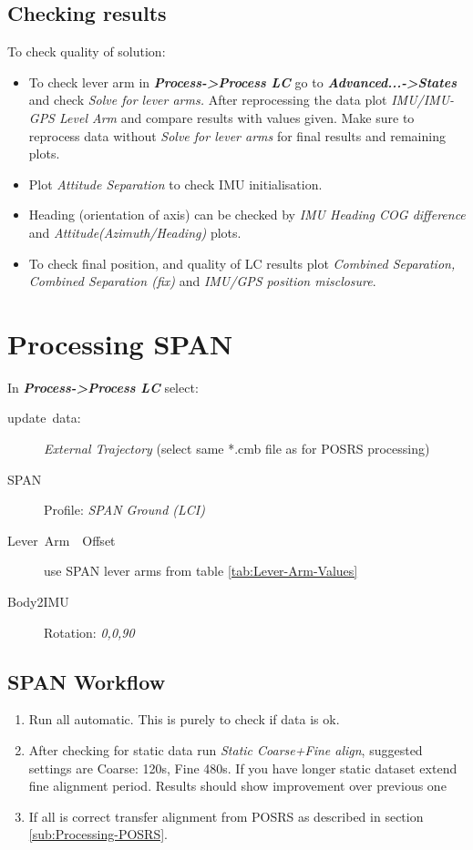 \documentclass[11pt,fleqn]{book} %
\begin{document}
\subsection{Checking results}

To check quality of solution:

\begin{itemize}
	\item To check lever arm in \textbf{\emph{Process->Process LC}} go to \textbf{\emph{Advanced...->States }}and check\emph{ Solve for lever arms. }After reprocessing the data plot\emph{ IMU/IMU-GPS Level Arm} and compare results with values given. Make sure to reprocess data without \emph{Solve for lever arms }for final results and remaining plots.
	\item Plot \emph{Attitude Separation} to check IMU initialisation.
	\item Heading (orientation of axis) can be checked by \emph{IMU Heading COG difference} and \emph{Attitude(Azimuth/Heading)} plots.
	\item To check final position, and quality of LC results plot \emph{Combined Separation, Combined Separation (fix)} and\emph{ IMU/GPS position misclosure}. 
\end{itemize}

\section{Processing SPAN}\label{sub:Processing-SPAN}

In \textbf{\emph{Process->Process LC}} select:
\begin{description}
	\item [{update~data:}] \emph{External Trajectory }(select same {*}.cmb
	file as for POSRS processing)
	\item [{SPAN}] Profile: \emph{SPAN Ground (LCI) }
	\item [{Lever~Arm~~Offset}] use SPAN lever arms from table \ref{tab:Lever-Arm-Values}
	\item [{Body2IMU}] Rotation: \emph{0,0,90}
\end{description}

\subsection{SPAN Workflow\label{sub:SPAN-Workflow}}

\begin{enumerate}
\item Run all automatic. This is purely to check if data is ok.
\item After checking for static data run \emph{Static Coarse+Fine align}, suggested settings are Coarse: 120s, Fine 480s. If you have longer static dataset extend fine alignment period. Results should show improvement over previous one
\item If all is correct transfer alignment from POSRS as described in section \ref{sub:Processing-POSRS}.
\end{enumerate}
\end{document}
